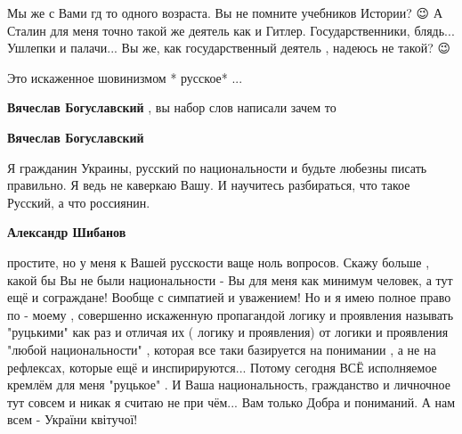 \begin{itemize}
\begin{itemize}
 

Мы же с Вами гд то одного возраста. Вы не помните учебников Истории? 😉 А
Сталин для меня точно такой же деятель как и Гитлер. Государственники, блядь...
Ушлепки и палачи... Вы же, как государственный деятель , надеюсь не такой? 😉

 
Это искаженное шовинизмом * русское* ...

 
\textbf{Вячеслав Богуславский} , вы набор слов написали зачем то

 
\textbf{Вячеслав Богуславский} 

Я гражданин Украины, русский по национальности и
будьте любезны писать правильно. Я ведь не каверкаю Вашу. И научитесь
разбираться, что такое Русский, а что россиянин.

 
\textbf{Александр Шибанов} 

простите, но у меня к Вашей русскости ваще ноль
вопросов. Скажу больше , какой бы Вы не были национальности - Вы для меня как
минимум человек, а тут ещё и сограждане! \Smiley[1.0][yellow] Вообще с симпатией и уважением! Но
и я имею полное право по - моему , совершенно искаженную пропагандой логику и
проявления называть "руцькими" как раз и отличая их ( логику и проявления) от
логики и проявления "любой национальности" , которая все таки базируется на
понимании , а не на рефлексах, которые ещё и инспирируются... Потому сегодня
ВСЁ исполняемое кремлём для меня "руцькое" . И Ваша национальность, гражданство
и личночное тут совсем и никак я считаю не при чём... \Smiley[1.0][yellow] Вам только Добра и
пониманий. А нам всем - України квітучої! \Smiley[1.0][yellow]


\end{itemize}
\end{itemize}
